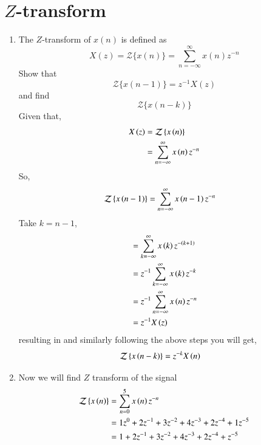 \documentclass[journal,12pt,twocolumn]{IEEEtran}
\renewcommand\thesection{\arabic{section}}
\begin{document}
\section{$Z$-transform}
\begin{enumerate}[label=\thesection.\arabic*]
\item The $Z$-transform of $x(n)$ is defined as 
%
\begin{equation}

X(z)={\mathcal {Z}}\{x(n)\}=\sum _{n=-\infty }^{\infty }x(n)z^{-n}
\end{equation}
%
Show that
\begin{equation}
{\mathcal {Z}}\{x(n-1)\} = z^{-1}X(z)
\end{equation}
and find
\begin{equation}
	{\mathcal {Z}}\{x(n-k)\} 
\end{equation}
\solution Given that,
  \begin{align}
     X\left(z\right) &= \mathcal{Z}\left\{x\left(n\right)\right\}\\
               &= \sum_{n = -\infty}^{\infty}x\left(n\right)z^{-n}
  \end{align}
  So,
   \begin{align}
     \mathcal{Z}\left\{x\left(n-1\right)\right\} &= \sum_{n=-\infty}^{\infty}x\left(n-1\right)z^{-n}
   \end{align}
   Take $k = n-1$,
   \begin{align}
           &= \sum_{k=-\infty}^{\infty}x\left(k\right)z^{-\left(k+1\right)}\\
           &= z^{-1}\sum_{k=-\infty}^{\infty}x\left(k\right)z^{-k}\\
           &= z^{-1}\sum_{n=-\infty}^{\infty}x\left(n\right)z^{-n}\\
           &= z^{-1}X\left(z\right)    
   \end{align}
   resulting in  and similarly following the above steps you will get,
     \begin{align}
          \mathcal{Z}\left\{x\left(n-k\right)\right\} &= z^{-k}X\left(n\right)\label{shift_k_Z_transform}
     \end{align} 
\item
   Now we will find $Z$ transform of the signal 
    \begin{align}
      \mathcal{Z}\cbrak{x\brak{n}} &= \sum_{n=0}^{5}x\brak{n}z^{-n}\\
                                   &= 1z^{0} + 2z^{-1} + 3z^{-2}+4z^{-3} + 2z^{-4} +1z^{-5}\\
                                   &= 1 + 2z^{-1} + 3z^{-2} + 4z^{-3} + 2z^{-4} + z^{-5} 

\end{align}
\end{enumerate}
\end{document}
